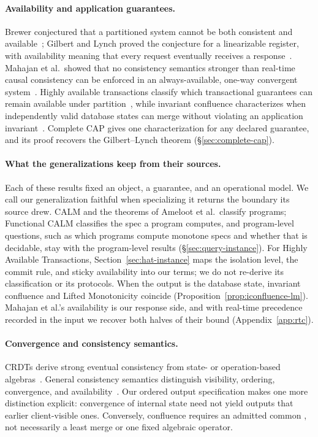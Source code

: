 \paragraph{Availability and application guarantees.}
Brewer conjectured that a partitioned system cannot be both consistent and
available~\cite{brewer2000towards}; Gilbert and Lynch proved the conjecture for
a linearizable register, with availability meaning that every request
eventually receives a response~\cite{gilbert2002cap}.  Mahajan et al.\ showed
that no consistency semantics stronger than real-time causal consistency can be
enforced in an always-available, one-way convergent
system~\cite{mahajan2011consistency}.  Highly
available transactions classify which transactional guarantees can remain
available under partition~\cite{bailis2013hat}, while invariant confluence
characterizes when independently valid database states can merge without
violating an application invariant~\cite{bailis2014coordination}.  Complete CAP gives one
characterization for any declared guarantee, and its proof recovers the
Gilbert--Lynch theorem (\S\ref{sec:complete-cap}).

\paragraph{What the generalizations keep from their sources.}
\label{sec:sources}
Each of these results fixed an object, a guarantee, and an operational model.
We call our generalization faithful when specializing it returns the boundary
its source drew.  CALM and the theorems of Ameloot et al.\ classify programs;
Functional CALM classifies the spec a program computes, and
program-level questions, such as which programs compute monotone
specs and whether that is decidable, stay with the program-level
results (\S\ref{sec:query-instance}).  For Highly Available
Transactions, Section~\ref{sec:hat-instance} maps the isolation level, the
commit rule, and sticky availability into our terms; we do not re-derive its
classification or its protocols.  When the output is the
database state, invariant confluence and Lifted Monotonicity coincide
(Proposition~\ref{prop:iconfluence-lm}).  Mahajan et al.'s availability is our
response side, and with real-time precedence recorded in the input we recover
both halves of their bound (Appendix~\ref{app:rtc}).

\paragraph{Convergence and consistency semantics.}
CRDTs derive strong eventual consistency from state- or operation-based
algebras~\cite{shapiro2011crdt}.  General consistency semantics distinguish
visibility, ordering, convergence, and
availability~\cite{burckhardt2014principles,mahajan2011consistency}.  Our ordered output
specification makes one more distinction explicit: convergence of internal
state need not yield outputs that \outrelbase earlier client-visible ones.  Conversely, confluence requires
an admitted common \outnoun, not necessarily a least merge or one fixed
algebraic operator.

